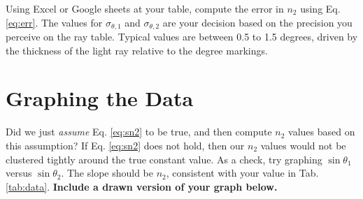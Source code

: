 \documentclass[12pt,twocolumn]{article}
\begin{document}
Using Excel or Google sheets at your table, compute the error in $n_2$ using Eq. \ref{eq:err}.  The values for $\sigma_{\theta,1}$ and $\sigma_{\theta,2}$ are your decision based on the precision you perceive on the ray table.  Typical values are between 0.5 to 1.5 degrees, driven by the thickness of the light ray relative to the degree markings.

\section{Graphing the Data}

Did we just \textit{assume} Eq. \ref{eq:sn2} to be true, and then compute $n_2$ values based on this assumption?  If Eq. \ref{eq:sn2} does not hold, then our $n_2$ values would not be clustered tightly around the true constant value.  As a check, try graphing $\sin\theta_1$ versus $\sin\theta_2$.  The slope should be $n_2$, consistent with your value in Tab. \ref{tab:data}.  \textbf{Include a drawn version of your graph below.}
\end{document}

